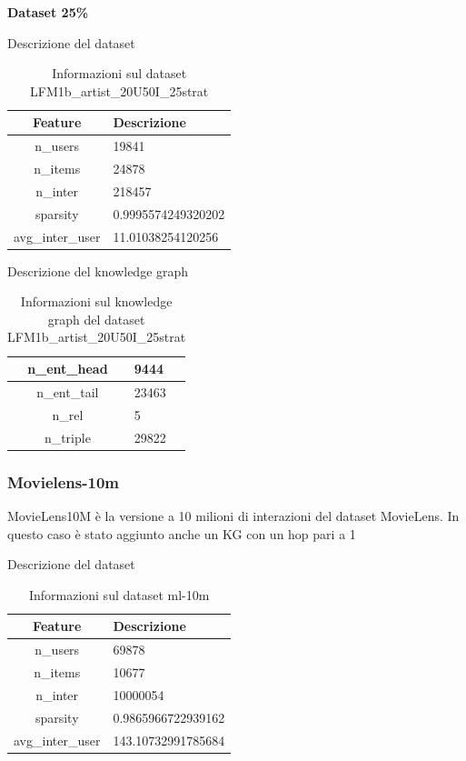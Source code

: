 \noindent\textbf{Dataset 25\%}

\noindent Descrizione del dataset
\begin{table}[H]
    \centering
    \footnotesize
    \begin{tabularx}{\textwidth}{|c|X|}
        \hline
        \textbf{Feature} & \textbf{Descrizione} \\
        \hline
        n\_users & 19841 \\
        \hline
        n\_items & 24878 \\
        \hline
        n\_inter & 218457 \\
        \hline
        sparsity & 0.9995574249320202 \\
        \hline
        avg\_inter\_user & 11.01038254120256 \\
        \hline
    \end{tabularx}
    \caption{Informazioni sul dataset LFM1b\_artist\_20U50I\_25strat}
    \label{tab:dataset_info}
\end{table}


\noindent Descrizione del knowledge graph
\begin{table}[H]
    \centering
    \footnotesize
    \begin{tabularx}{\textwidth}{|c|X|}
        \hline
        n\_ent\_head & 9444 \\
        \hline
        n\_ent\_tail & 23463 \\
        \hline
        n\_rel & 5 \\
        \hline
        n\_triple & 29822 \\
        \hline
    \end{tabularx}
    \caption{Informazioni sul knowledge graph del dataset LFM1b\_artist\_20U50I\_25strat}
    \label{tab:dataset_info}
\end{table}

\subsubsection{Movielens-10m}
\noindent MovieLens10M è la versione a 10 milioni di interazioni del dataset MovieLens. In questo caso è stato aggiunto anche un KG con un hop pari a 1

\noindent Descrizione del dataset
\begin{table}[H]
    \centering
    \footnotesize
    \begin{tabularx}{\textwidth}{|c|X|}
        \hline
        \textbf{Feature} & \textbf{Descrizione} \\
        \hline
        n\_users & 69878 \\
        \hline
        n\_items & 10677 \\
        \hline
        n\_inter & 10000054 \\
        \hline
        sparsity & 0.9865966722939162 \\
        \hline
        avg\_inter\_user & 143.10732991785684 \\
        \hline
    \end{tabularx}
    \caption{Informazioni sul dataset ml-10m}
    \label{tab:dataset_info}
\end{table}


